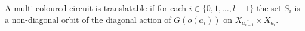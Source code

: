 \documentclass[preview]{standalone}
\begin{document}
\begin{center}
A multi-coloured circuit is translatable if for each $i \in \{0, 1, \dots, l-1\}$ the set $S_i$ is a non-diagonal orbit of the diagonal action of $G(o(a_i))$ on $X_{\overline{a_{i-1}}} \times X_{a_i}$.
\end{center}
\end{document}
